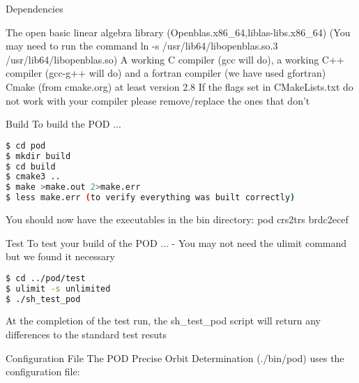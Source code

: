 Dependencies

The open basic linear algebra library (Openblas.x86\_64,liblas-libs.x86\_64) (You may need to run the command ln -s /usr/lib64/libopenblas.so.3 /usr/lib64/libopenblas.so)
A working C compiler (gcc will do), a working C++ compiler (gcc-g++ will do) and a fortran compiler (we have used gfortran)
Cmake (from cmake.org) at least version 2.8
If the flags set in CMakeLists.txt do not work with your compiler please remove/replace the ones that don't

Build
To build the POD ...
\begin{lstlisting}[language=bash]
$ cd pod
$ mkdir build
$ cd build
$ cmake3 .. 
$ make >make.out 2>make.err
$ less make.err (to verify everything was built correctly)
\end{lstlisting}
You should now have the executables in the bin directory: pod crs2trs brdc2ecef

Test
To test your build of the POD ... - You may not need the ulimit command but we found it necessary

\begin{lstlisting}[language=bash]
$ cd ../pod/test
$ ulimit -s unlimited
$ ./sh_test_pod
\end{lstlisting}

At the completion of the test run, the sh\_test\_pod script will return any differences to the standard test resuts
    


Configuration File
The POD Precise Orbit Determination (./bin/pod) uses the configuration file: 


%
